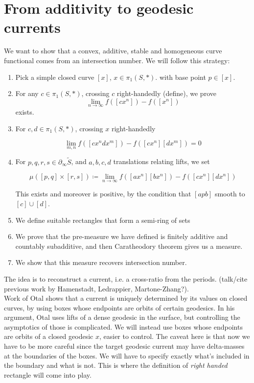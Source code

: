 




\section{From additivity to geodesic currents}

We want to show that a convex, additive, stable and homogeneous curve functional comes from an intersection number.
We will follow this strategy:

\begin{enumerate}
    \item Pick a simple closed curve $[x]$, $x \in \pi_1(S,*)$. with base point $p \in [x]$.
    \item For any $c \in \pi_1(S,*)$, crossing $c$ right-handedly (define), we prove
    \[
      \lim_{n \to \infty} f([cx^n])-f([x^n])
    \]
    exists.
    \item For $c,d \in \pi_1(S,*)$, crossing $x$ right-handedly
    
    \[
       \lim_{m,n} f([cx^ndx^m])-f([cx^n][dx^m])=0
    \]
    
    \item For $p,q,r,s \in \partial_{\infty} \tilde{S}$, and $a,b,c,d$ translations relating lifts, we set
    
    \[
       \mu([p,q] \times [r,s]) \coloneqq \lim_{n \to \infty} f([ax^n][bx^n])-f([cx^n][dx^n])
    \]
    
    This exists and moreover is positive, by the condition that $[ap b]$ smooth to $[c] \cup [d]$.
    \item We define suitable rectangles that form a semi-ring of sets
    \item We prove that the pre-measure we have defined is finitely additive and countably subadditive, and then Caratheodory theorem gives us a measure.
    \item We show that this measure recovers intersection number.
\end{enumerate}

The idea is to reconstruct a current, i.e. a cross-ratio from the periods. (talk/cite previous work by Hamenstadt, Ledrappier, Martone-Zhang?).\\
Work of Otal \cite{Otal90:SpectreMarqueNegative} shows that a current is uniquely determined by its values on closed curves, by using boxes whose endpoints are orbits of certain geodesics.
In his argument, Otal uses lifts of a dense geodesic in the surface, but controlling the asymptotics of those is complicated.
We will instead use boxes whose endpoints are orbits of a closed geodesic $x$, easier to control. The caveat here is that
now we have to be more careful since the target geodesic current may have
delta-masses at the boundaries of the boxes. We will have to specify exactly what's included in the boundary and what is not.
This is where the definition of \emph{right handed} rectangle will come into play. \\

